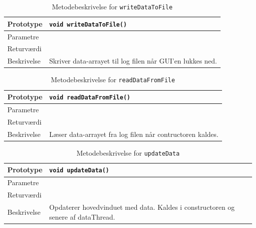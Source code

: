 \begin{table}[H]
\begin{tabularx}{\textwidth}{| L{2.5 cm} | Z |} \hline
Prototype & \texttt{void writeDataToFile()} \\\hline
Parametre &  \\\hline
Returværdi &  \\\hline
Beskrivelse & Skriver data-arrayet til log filen når GUI'en lukkes ned.  \\\hline
\end{tabularx}
\caption{Metodebeskrivelse for \texttt{writeDataToFile}}
\label{table:met_writeDataToFile}
\end{table}

\begin{table}[H]
\begin{tabularx}{\textwidth}{| L{2.5 cm} | Z |} \hline
Prototype & \texttt{void readDataFromFile()} \\\hline
Parametre &  \\\hline
Returværdi &  \\\hline
Beskrivelse & Læser data-arrayet fra log filen når contructoren kaldes.  \\\hline
\end{tabularx}
\caption{Metodebeskrivelse for \texttt{readDataFromFile}}
\label{table:met_readDataFromFile}
\end{table}

\begin{table}[H]
\begin{tabularx}{\textwidth}{| L{2.5 cm} | Z |} \hline
Prototype & \texttt{void updateData()} \\\hline
Parametre &  \\\hline
Returværdi &  \\\hline
Beskrivelse & Opdaterer hovedvinduet med data. Kaldes i constructoren og senere af dataThread.   \\\hline
\end{tabularx}
\caption{Metodebeskrivelse for \texttt{updateData}}
\label{table:met_updateData}
\end{table}